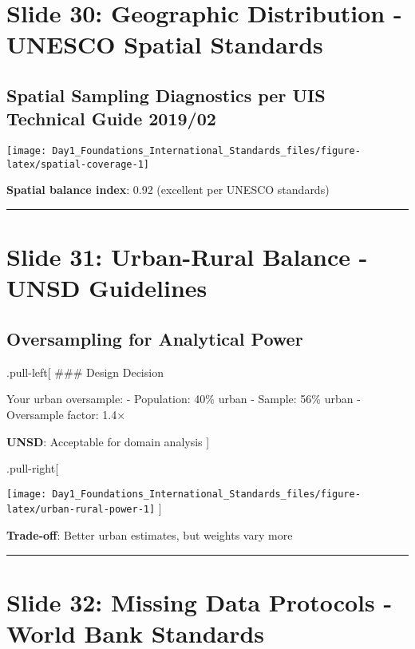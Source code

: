 \documentclass[
]{article}
\begin{document}
\section{Slide 30: Geographic Distribution - UNESCO Spatial
Standards}\label{slide-30-geographic-distribution---unesco-spatial-standards}

\subsection{Spatial Sampling Diagnostics per UIS Technical Guide
2019/02}\label{spatial-sampling-diagnostics-per-uis-technical-guide-201902}

\texttt{[image: Day1\_Foundations\_International\_Standards\_files/figure-latex/spatial-coverage-1]}

\textbf{Spatial balance index}: 0.92 (excellent per UNESCO standards)

\begin{center}\rule{0.5\linewidth}{0.5pt}\end{center}

\section{Slide 31: Urban-Rural Balance - UNSD
Guidelines}\label{slide-31-urban-rural-balance---unsd-guidelines}

\subsection{Oversampling for Analytical
Power}\label{oversampling-for-analytical-power}

.pull-left{[} \#\#\# Design Decision

Your urban oversample: - Population: 40\% urban - Sample: 56\% urban -
Oversample factor: 1.4×

\textbf{UNSD}: Acceptable for domain analysis {]}

.pull-right{[}

\texttt{[image: Day1\_Foundations\_International\_Standards\_files/figure-latex/urban-rural-power-1]}
{]}

\textbf{Trade-off}: Better urban estimates, but weights vary more

\begin{center}\rule{0.5\linewidth}{0.5pt}\end{center}

\section{Slide 32: Missing Data Protocols - World Bank
Standards}\label{slide-32-missing-data-protocols---world-bank-standards}
\end{document}
